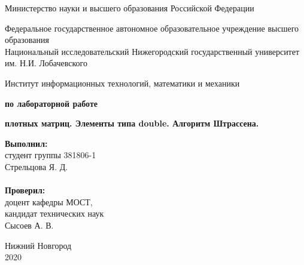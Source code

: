 \documentclass{report}
\begin{document}
\begin{titlepage}

\begin{center}
Министерство науки и высшего образования Российской Федерации
\end{center}

\begin{center}
Федеральное государственное автономное образовательное учреждение высшего образования \\
Национальный исследовательский Нижегородский государственный университет им. Н.И. Лобачевского
\end{center}

\begin{center}
Институт информационных технологий, математики и механики
\end{center}

\vspace{4em}

\begin{center}
\textbf{ по лабораторной работе} \\
\end{center}
\begin{center}
\textbf{ плотных матриц. Элементы типа double. Алгоритм Штрассена.} \\
\end{center}

\vspace{4em}

\newbox{\lbox}
\newlength{\maxl}
\setlength{\maxl}{\wd\lbox}
\hfill\parbox{7cm}{
\hspace*{5cm}\hspace*{-5cm}\textbf{Выполнил:} \\ студент группы 381806-1 \\ Стрельцова Я. Д.\\
\\
\hspace*{5cm}\hspace*{-5cm}\textbf{Проверил:}\\ доцент кафедры МОСТ, \\ кандидат технических наук \\ Сысоев А. В.\\
}
\vspace{\fill}

\begin{center} Нижний Новгород \\ 2020 \end{center}

\end{titlepage}
\end{document}
